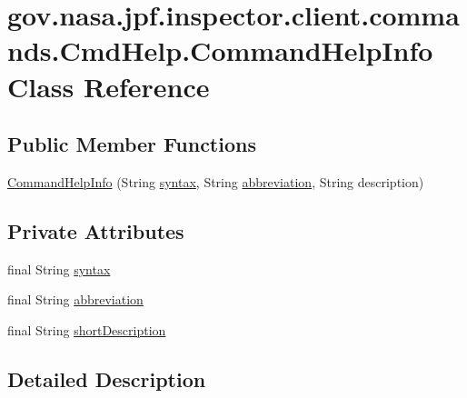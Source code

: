 \hypertarget{classgov_1_1nasa_1_1jpf_1_1inspector_1_1client_1_1commands_1_1_cmd_help_1_1_command_help_info}{}\section{gov.\+nasa.\+jpf.\+inspector.\+client.\+commands.\+Cmd\+Help.\+Command\+Help\+Info Class Reference}
\label{classgov_1_1nasa_1_1jpf_1_1inspector_1_1client_1_1commands_1_1_cmd_help_1_1_command_help_info}
\subsection*{Public Member Functions}
\begin{DoxyCompactItemize}
\item 
\hyperlink{classgov_1_1nasa_1_1jpf_1_1inspector_1_1client_1_1commands_1_1_cmd_help_1_1_command_help_info_ae7bd2b9811cd454d475bc60e3c94ed12}{Command\+Help\+Info} (String \hyperlink{classgov_1_1nasa_1_1jpf_1_1inspector_1_1client_1_1commands_1_1_cmd_help_1_1_command_help_info_a4d409ae170049b77efbc1c895415383d}{syntax}, String \hyperlink{classgov_1_1nasa_1_1jpf_1_1inspector_1_1client_1_1commands_1_1_cmd_help_1_1_command_help_info_a9e786c0959d4cf798886fbd116937fad}{abbreviation}, String description)
\end{DoxyCompactItemize}
\subsection*{Private Attributes}
\begin{DoxyCompactItemize}
\item 
final String \hyperlink{classgov_1_1nasa_1_1jpf_1_1inspector_1_1client_1_1commands_1_1_cmd_help_1_1_command_help_info_a4d409ae170049b77efbc1c895415383d}{syntax}
\item 
final String \hyperlink{classgov_1_1nasa_1_1jpf_1_1inspector_1_1client_1_1commands_1_1_cmd_help_1_1_command_help_info_a9e786c0959d4cf798886fbd116937fad}{abbreviation}
\item 
final String \hyperlink{classgov_1_1nasa_1_1jpf_1_1inspector_1_1client_1_1commands_1_1_cmd_help_1_1_command_help_info_a60ab45703cb24f7115da221c75ff30a4}{short\+Description}
\end{DoxyCompactItemize}


\subsection{Detailed Description}


